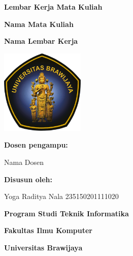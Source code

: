 \begin{titlepage}
    \centering
    
    {\Large 
        \textbf{Lembar Kerja Mata Kuliah} \par
        \textbf{Nama Mata Kuliah} \par
    }

    \vspace{0.5cm}

    \large \textbf{Nama Lembar Kerja}

    \vfill

    \includegraphics[width=0.3\textwidth]{figures/ub_logo.png}\par

    \vfill

    \textbf{Dosen pengampu:} \par
    Nama Dosen
    
    \vspace{1cm}

    \textbf{Disusun oleh:} \par
    Yoga Raditya Nala \hspace{1cm} 235150201111020 \par

    \vfill

    {\large
        \textbf{Program Studi Teknik Informatika} \par
        \textbf{Fakultas Ilmu Komputer} \par
        \textbf{Universitas Brawijaya}\par
        \textbf{\the\year} \par
    }
\end{titlepage}
